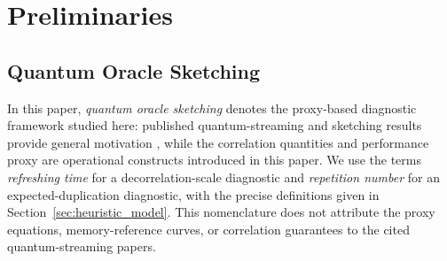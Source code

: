 \documentclass[sensors,article,submit,pdftex,moreauthors]{Definitions/mdpi}
\newcommand{\bigO}{\mathcal{O}}
\providecommand{\DIFadd}[1]{{\protect\color{blue}#1}} %
\providecommand{\DIFdel}[1]{} %
\providecommand{\DIFaddbegin}{} %
\providecommand{\DIFaddend}{} %
\providecommand{\DIFdelbegin}{} %
\providecommand{\DIFdelend}{} %
\begin{document}
\section{Preliminaries}
\label{sec:prelim}

\subsection{Quantum Oracle Sketching}

\DIFdelbegin \DIFdel{The originating work }%
\DIFdel{shows that a polylogarithmic-size quantum computer ($\bigO(n)$ qubits for $n$-dimensional data, $N = 2^n$) can perform classification and dimension reduction on massive classical data by processing random samples on the fly via quantum oracle sketching ; Boolean function learning is one concrete instantiation. For several concrete tasks, }\DIFdelend \DIFaddbegin \DIFadd{In this paper, }\emph{\DIFadd{quantum oracle sketching}} \DIFadd{denotes the proxy-based diagnostic framework studied here: published quantum-streaming and sketching results provide general motivation }\citep{kallaugher2021streaming, kallaugher2024maxdicut, kallaugher2025designquantum}\DIFadd{, while the correlation quantities and performance proxy are operational constructs introduced in this paper. We use }\DIFaddend the \DIFdelbegin \DIFdel{classical memory requirement scales polynomially in $N$, yielding an exponential memory gap. Their correlated-data extension uses a structured data-generation model that accounts for temporal dependence; we adopt the }\DIFdelend terms \emph{refreshing time} \DIFdelbegin \DIFdel{(decorrelation scale) }\DIFdelend \DIFaddbegin \DIFadd{for a decorrelation-scale diagnostic }\DIFaddend and \emph{repetition number} \DIFdelbegin \DIFdel{(expected duplication) as our operational labels for the key correlation parameters, noting that our definitions (}\DIFdelend \DIFaddbegin \DIFadd{for an expected-duplication diagnostic, with the precise definitions given in }\DIFaddend Section~\ref{sec:heuristic_model}\DIFdelbegin \DIFdel{) are inspired by but not necessarily identical to the exact quantities in their framework.
Classical hardness results are task-specific, not a universal lower bound.
}\DIFdelend \DIFaddbegin \DIFadd{. This nomenclature does not attribute the proxy equations, memory-reference curves, or correlation guarantees to the cited quantum-streaming papers.
}\DIFaddend 
\end{document}
